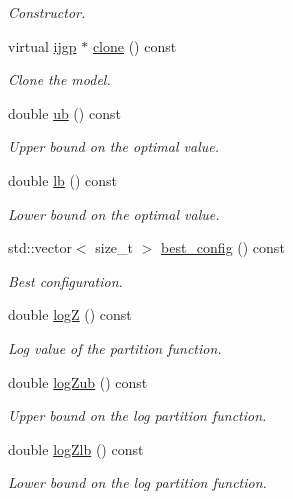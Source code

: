 \begin{DoxyCompactItemize}
\begin{DoxyCompactList}\small\item\em Constructor. \end{DoxyCompactList}\item 
virtual \hyperlink{classmerlin_1_1ijgp}{ijgp} $\ast$ \hyperlink{classmerlin_1_1ijgp_af3ecb1e386de25e892d3246e9fd14a1e}{clone} () const 
\begin{DoxyCompactList}\small\item\em Clone the model. \end{DoxyCompactList}\item 
double \hyperlink{classmerlin_1_1ijgp_aa5813f62d79f2a2c2fcdb24cbc967040}{ub} () const 
\begin{DoxyCompactList}\small\item\em Upper bound on the optimal value. \end{DoxyCompactList}\item 
double \hyperlink{classmerlin_1_1ijgp_ae4313682960f210fc937627446fb70cf}{lb} () const 
\begin{DoxyCompactList}\small\item\em Lower bound on the optimal value. \end{DoxyCompactList}\item 
std\+::vector$<$ size\+\_\+t $>$ \hyperlink{classmerlin_1_1ijgp_af54b5585c353a821071a1ac1f0570679}{best\+\_\+config} () const 
\begin{DoxyCompactList}\small\item\em Best configuration. \end{DoxyCompactList}\item 
double \hyperlink{classmerlin_1_1ijgp_afb334bdd8a981984f1f97ce0d5c58bed}{logZ} () const 
\begin{DoxyCompactList}\small\item\em Log value of the partition function. \end{DoxyCompactList}\item 
double \hyperlink{classmerlin_1_1ijgp_ac0851bfb0a95f0a8ff4b00af298bf743}{log\+Zub} () const 
\begin{DoxyCompactList}\small\item\em Upper bound on the log partition function. \end{DoxyCompactList}\item 
double \hyperlink{classmerlin_1_1ijgp_aa19a722eda63c9471795aff804985d4e}{log\+Zlb} () const 
\begin{DoxyCompactList}\small\item\em Lower bound on the log partition function. \end{DoxyCompactList}\item 

\end{DoxyCompactItemize}
